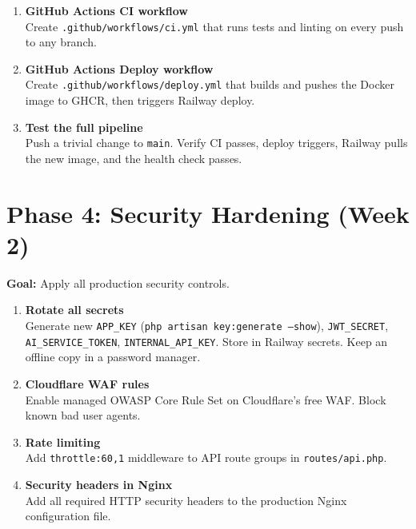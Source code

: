 \documentclass[12pt,a4paper]{report}
\begin{document}
\begin{enumerate}[leftmargin=1.5em, label=\textbf{\arabic*.}, start=13]

    \item \textbf{GitHub Actions CI workflow} \\
    Create \texttt{.github/workflows/ci.yml} that runs tests and
    linting on every push to any branch.

    \item \textbf{GitHub Actions Deploy workflow} \\
    Create \texttt{.github/workflows/deploy.yml} that builds and
    pushes the Docker image to GHCR, then triggers Railway deploy.

    \item \textbf{Test the full pipeline} \\
    Push a trivial change to \texttt{main}. Verify CI passes, deploy
    triggers, Railway pulls the new image, and the health check passes.

\end{enumerate}

\section{Phase 4: Security Hardening (Week 2)}

\textbf{Goal:} Apply all production security controls.

\begin{enumerate}[leftmargin=1.5em, label=\textbf{\arabic*.}, start=16]

    \item \textbf{Rotate all secrets} \\
    Generate new \texttt{APP\_KEY} (\texttt{php artisan key:generate
    --show}), \texttt{JWT\_SECRET}, \texttt{AI\_SERVICE\_TOKEN},
    \texttt{INTERNAL\_API\_KEY}. Store in Railway secrets. Keep an
    offline copy in a password manager.

    \item \textbf{Cloudflare WAF rules} \\
    Enable managed OWASP Core Rule Set on Cloudflare's free WAF.
    Block known bad user agents.

    \item \textbf{Rate limiting} \\
    Add \texttt{throttle:60,1} middleware to API route groups in
    \texttt{routes/api.php}.

    \item \textbf{Security headers in Nginx} \\
    Add all required HTTP security headers to the production Nginx
    configuration file.

\end{enumerate}
\end{document}
